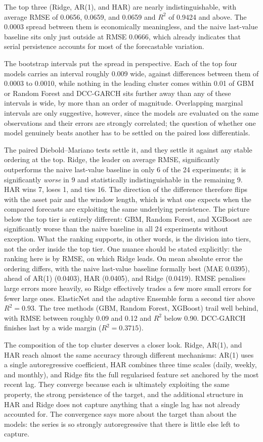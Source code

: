 The top three (Ridge, AR(1), and HAR) are nearly indistinguishable, with average RMSE of 0.0656, 0.0659, and 0.0659 and $R^2$ of 0.9424 and above. The 0.0003 spread between them is economically meaningless, and the naive last-value baseline sits only just outside at RMSE 0.0666, which already indicates that serial persistence accounts for most of the forecastable variation.

The bootstrap intervals put the spread in perspective. Each of the top four models carries an interval roughly 0.009 wide, against differences between them of 0.0003 to 0.0010, while nothing in the leading cluster comes within 0.01 of GBM or Random Forest and DCC-GARCH sits further away than any of these intervals is wide, by more than an order of magnitude. Overlapping marginal intervals are only suggestive, however, since the models are evaluated on the same observations and their errors are strongly correlated; the question of whether one model genuinely beats another has to be settled on the paired loss differentials.

The paired Diebold--Mariano tests settle it, and they settle it against any stable ordering at the top. Ridge, the leader on average RMSE, significantly outperforms the naive last-value baseline in only 6 of the 24 experiments; it is significantly \emph{worse} in 9 and statistically indistinguishable in the remaining 9. HAR wins 7, loses 1, and ties 16. The direction of the difference therefore flips with the asset pair and the window length, which is what one expects when the compared forecasts are exploiting the same underlying persistence. The picture below the top tier is entirely different: GBM, Random Forest, and XGBoost are significantly worse than the naive baseline in all 24 experiments without exception. What the ranking supports, in other words, is the division into tiers, not the order inside the top tier. One nuance should be stated explicitly: the ranking here is by RMSE, on which Ridge leads. On mean absolute error the ordering differs, with the naive last-value baseline formally best (MAE 0.0395), ahead of AR(1) (0.0403), HAR (0.0405), and Ridge (0.0419). RMSE penalises large errors more heavily, so Ridge effectively trades a few more small errors for fewer large ones. ElasticNet and the adaptive Ensemble form a second tier above $R^2 = 0.93$. The tree methods (GBM, Random Forest, XGBoost) trail well behind, with RMSE between roughly 0.09 and 0.12 and $R^2$ below 0.90. DCC-GARCH finishes last by a wide margin ($R^2 = 0.3715$).

The composition of the top cluster deserves a closer look. Ridge, AR(1), and HAR reach almost the same accuracy through different mechanisms: AR(1) uses a single autoregressive coefficient, HAR combines three time scales (daily, weekly, and monthly), and Ridge fits the full regularised feature set anchored by the most recent lag. They converge because each is ultimately exploiting the same property, the strong persistence of the target, and the additional structure in HAR and Ridge does not capture anything that a single lag has not already accounted for. The convergence says more about the target than about the models: the series is so strongly autoregressive that there is little else left to capture.

